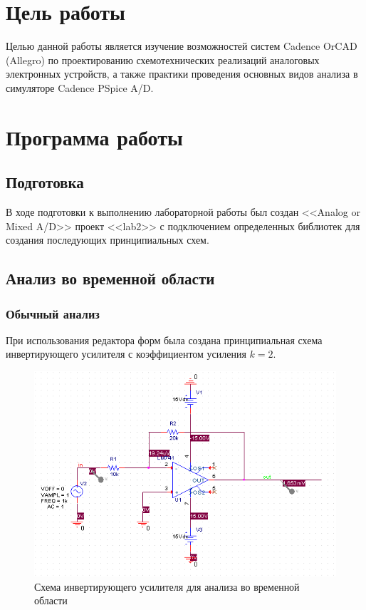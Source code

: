 \documentclass[utf8x, 12pt]{G7-32}
\begin{document}
\frontmatter 

\thispagestyle{empty}
\setcounter{page}{0}
\tableofcontents
\clearpage
\mainmatter



\chapter{Цель работы}

Целью данной работы является изучение возможностей систем Cadence OrCAD (Allegro) по проектированию схемотехнических реализаций аналоговых электронных устройств, а также практики проведения основных видов анализа в симуляторе Cadence PSpice A/D.


\chapter{Программа работы}

\section{Подготовка}

В ходе подготовки к выполнению лабораторной работы был создан <<Analog or Mixed A/D>> проект <<lab2>> с подключением определенных библиотек для создания последующих принципиальных схем. 


\section{Анализ во временной области}
 
\subsection{Обычный анализ}
 
При использования редактора форм была создана принципиальная схема инвертирующего усилителя с коэффициентом усиления $k = 2$. 


\begin{figure}[h]
	\begin{center}
		\includegraphics[width=12cm]{img/shema_1}
	\end{center}
	\vspace{-5mm}\caption{Схема инвертирующего усилителя для анализа во временной области}
\end{figure}	
\end{document}

